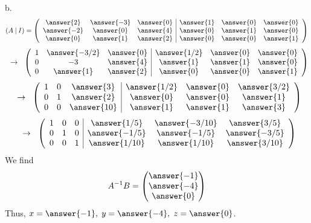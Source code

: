 \documentclass{ximera}
\begin{document}
\begin{exercise}
\begin{prompt}
b. 
\[ (A \hspace{.08cm} | \hspace{.08cm} I) = \left(\begin{array}{ccc|ccc}
  \answer{2} & \answer{-3} & \answer{0} &  \answer{1} & \answer{0} & \answer{0}  \\
  \answer{-2} & \answer{0} & \answer{4} & \answer{0} & \answer{1} & \answer{0}\\
  \answer{0} & \answer{1} & \answer{2} &\answer{0} & \answer{0} & \answer{1}
\end{array}\right)
\]
\[
\hspace{.2cm} \rightarrow \hspace{.2cm}
\left(\begin{array}{ccc|ccc}
  1 & \answer{-3/2} & \answer{0} &  \answer{1/2} & \answer{0} & \answer{0}  \\
  0 & -3 & \answer{4} & \answer{1} & \answer{1} & \answer{0}\\
  0 & \answer{1} & \answer{2} &\answer{0} & \answer{0} & \answer{1}
\end{array}\right)
\]
\[
\hspace{.2cm} \rightarrow \hspace{.2cm}
\left(\begin{array}{ccc|ccc}
  1 & 0 & \answer{3} &  \answer{1/2} & \answer{0} & \answer{3/2}  \\
  0 & 1 & \answer{2} & \answer{0} & \answer{0} & \answer{1}\\
  0 & 0 & \answer{10} &\answer{1} & \answer{1} & \answer{3}
\end{array}\right)
\]
\[
\hspace{.2cm} \rightarrow \hspace{.2cm}
\left(\begin{array}{ccc|ccc}
  1 & 0 & 0 &  \answer{1/5} & \answer{-3/10} & \answer{3/5}  \\
  0 & 1 & 0 & \answer{-1/5} & \answer{-1/5} & \answer{-3/5}\\
  0 & 0 &1 &\answer{1/10} & \answer{1/10} & \answer{3/10}
\end{array}\right)
\]
We find 
\[A^{-1}B = \begin{pmatrix}
\answer{-1}\\
\answer{-4}\\
\answer{0}
\end{pmatrix}
\]
Thus, $x= \answer{-1}, \hspace{.1cm} y= \answer{-4},\hspace{.1cm} z= \answer{0}$. 
\end{prompt}
\end{exercise}
\end{document}

